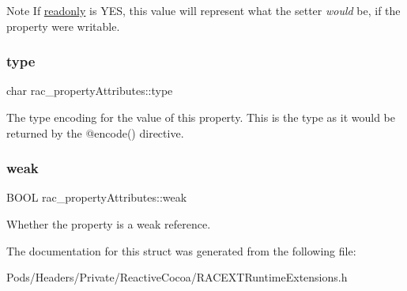 \begin{DoxyNote}{Note}
If \mbox{\hyperlink{structrac__property_attributes_abb7d2cfe35836a37e19bba2982a9f063}{readonly}} is {\ttfamily Y\+ES}, this value will represent what the setter {\itshape would} be, if the property were writable. 
\end{DoxyNote}
\mbox{\label{structrac__property_attributes_a977dc6d9be17be26f0969e0eef2c79ae}} 
\subsubsection{\texorpdfstring{type}{type}}
{\footnotesize\ttfamily char rac\+\_\+property\+Attributes\+::type}

The type encoding for the value of this property. This is the type as it would be returned by the {\ttfamily @encode()} directive. \mbox{\label{structrac__property_attributes_ad5781075af21b27167f149d755de00f6}} 
\subsubsection{\texorpdfstring{weak}{weak}}
{\footnotesize\ttfamily B\+O\+OL rac\+\_\+property\+Attributes\+::weak}

Whether the property is a weak reference. 

The documentation for this struct was generated from the following file\+:\begin{DoxyCompactItemize}
\item 
Pods/\+Headers/\+Private/\+Reactive\+Cocoa/R\+A\+C\+E\+X\+T\+Runtime\+Extensions.\+h\end{DoxyCompactItemize}
